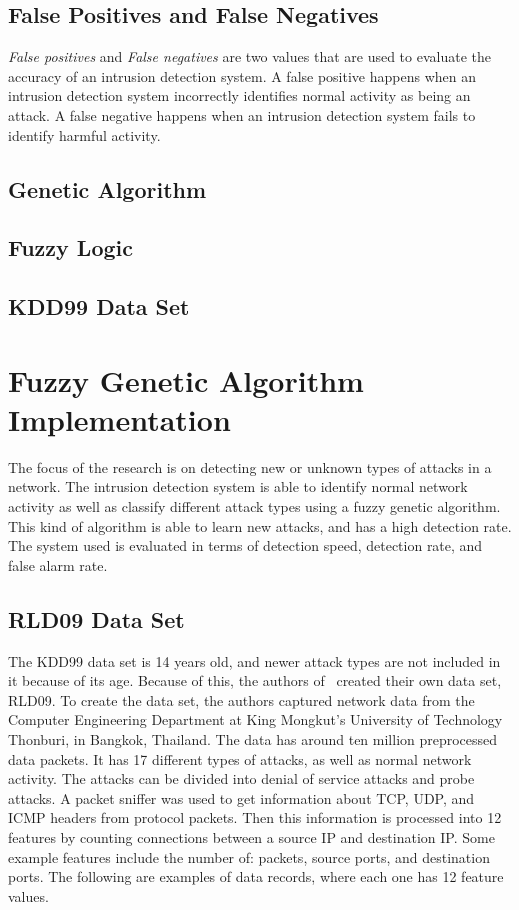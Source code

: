 \documentclass{sig-alternate}
\begin{document}
\subsection{False Positives and False Negatives}
\emph{False positives} and \emph{False negatives} are two values that are used to evaluate the accuracy of an intrusion detection system. A false positive happens when an intrusion detection system incorrectly identifies normal activity as being an attack. A false negative happens when an intrusion detection system fails to identify harmful activity.~\cite{Liao201316}




\subsection{Genetic Algorithm}

\subsection{Fuzzy Logic}

\subsection{KDD99 Data Set}





\section{Fuzzy Genetic Algorithm Implementation}
The focus of the research is on detecting new or unknown types of attacks in a network. The intrusion detection system is able to identify normal network activity as well as classify different attack types using a fuzzy genetic algorithm. This kind of algorithm is able to learn new attacks, and has a high detection rate. The system used is evaluated in terms of detection speed, detection rate, and false alarm rate.~\cite{6496342, 6559603}




\subsection{RLD09 Data Set}
The KDD99 data set is 14 years old, and newer attack types are not included in it because of its age. Because of this, the authors of~\cite{6496342, 6559603} created their own data set, RLD09. To create the data set, the authors captured network data from the Computer Engineering Department at King Mongkut's University of Technology Thonburi, in Bangkok, Thailand. The data has around ten million preprocessed data packets. It has 17 different types of attacks, as well as normal network activity. The attacks can be divided into denial of service attacks and probe attacks. A packet sniffer was used to get information about TCP, UDP, and ICMP headers from protocol packets. Then this information is processed into 12 features by counting connections between a source IP and destination IP. Some example features include the number of: packets, source ports, and destination ports. The following are examples of data records, where each one has 12 feature values.
\end{document}
